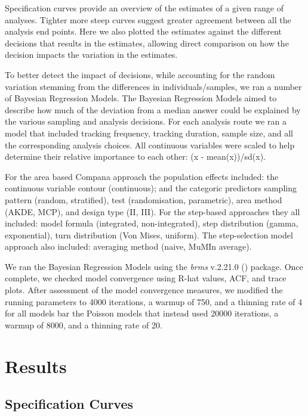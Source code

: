 \documentclass[10pt,a4paper]{article}
\begin{document}
Specification curves provide an overview of the estimates of a given range of analyses.
Tighter more steep curves suggest greater agreement between all the analysis end points.
Here we also plotted the estimates against the different decisions that results in the estimates, allowing direct comparison on how the decision impacts the variation in the estimates.

To better detect the impact of decisions, while accounting for the random variation stemming from the differences in individuals/samples, we ran a number of Bayesian Regression Models.
The Bayesian Regression Models aimed to describe how much of the deviation from a median answer could be explained by the various sampling and analysis decisions.
For each analysis route we ran a model that included tracking frequency, tracking duration, sample size, and all the corresponding analysis choices.
All continuous variables were scaled to help determine their relative importance to each other: (x - mean(x))/sd(x).

For the area based Compana approach the population effects included: the continuous variable contour (continuous); and the categoric predictors sampling pattern (random, stratified), test (randomisation, parametric), area method (AKDE, MCP), and design type (II, III).
For the step-based approaches they all included: model formula (integrated, non-integrated), step distribution (gamma, exponential), turn distribution (Von Mises, uniform).
The step-selection model approach also included: averaging method (naive, MuMIn average).

We ran the Bayesian Regression Models using the \emph{brms} v.2.21.0 () package.
Once complete, we checked model convergence using R-hat values, ACF, and trace plots.
After assessment of the model convergence measures, we modified the running parameters to 4000 iterations, a warmup of 750, and a thinning rate of 4 for all models bar the Poisson models that instead used 20000 iterations, a warmup of 8000, and a thinning rate of 20.

\section{Results}\label{results}

\subsection{Specification Curves}\label{specification-curves}
\end{document}
